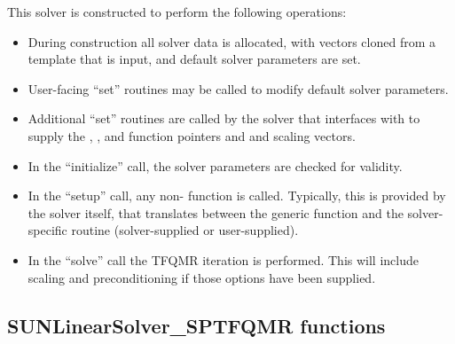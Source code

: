 This solver is constructed to perform the following operations:
\begin{itemize}
\item During construction all {\nvector} solver data is allocated,
  with vectors cloned from a template {\nvector} that is input, and
  default solver parameters are set.
\item User-facing ``set'' routines may be called to modify default
  solver parameters.
\item Additional ``set'' routines are called by the {\sundials} solver
  that interfaces with \newline {\sunlinsolsptfqmr} to supply the
  , , and  function pointers and
   and  scaling vectors.
\item In the ``initialize'' call, the solver parameters are checked
  for validity.
\item In the ``setup'' call, any non-
   function is called.  Typically, this is provided by
  the {\sundials} solver itself, that translates between the
  generic  function and the
  solver-specific routine (solver-supplied or user-supplied).
\item In the ``solve'' call the TFQMR iteration is performed.  This
  will include scaling and preconditioning if those options have been
  supplied.
\end{itemize}


\subsection{SUNLinearSolver\_SPTFQMR functions}
\label{ss:sunlinsol_sptfqmr_functions}

